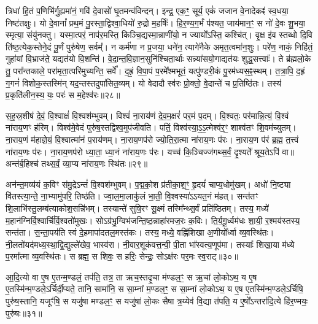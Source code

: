 त्रिधा॑ हि॒तं प॒णिभि॑र्गु॒ह्यमा॑नं॒ गवि॑ दे॒वासो॑ घृ॒तमन्व॑विन्दन्। 
इन्द्र॒ एक॒ꣳ॒ सूर्य॒ एकं॑ जजान वे॒नादेकꣴ॑ स्व॒धया॒ निष्ट॑तक्षुः। 
यो दे॒वानां᳚ प्रथ॒मं पु॒रस्ता॒द्विश्वा॒धियो॑ रु॒द्रो म॒हर्\mbox{}षिः॑। 
हि॒र॒ण्य॒ग॒र्भं प॑श्यत॒ जाय॑मान॒ꣳ॒ स नो॑ दे॒वः शु॒भया॒ स्मृत्या॒ संयु॑नक्तु। 
यस्मा॒त्परं॒ नाप॑र॒मस्ति॒ किञ्चि॒द्यस्मा॒न्नाणी॑यो॒ न ज्यायो᳚ऽस्ति॒ कश्चि॑त्। 
वृ॒क्ष इ॑व स्तब्धो दि॒वि ति॑ष्ठ॒त्येक॒स्तेने॒दं पू॒र्णं पुरु॑षेण॒ सर्वम्᳚। 
न कर्म॑णा न प्र॒जया॒ धने॑न॒ त्यागे॑नैके अमृत॒त्वमा॑न॒शुः। 
परे॑ण॒ नाकं॒ निहि॑तं॒ गुहा॑यां वि॒भ्राज॑ते॒ यद्यत॑यो वि॒शन्ति॑। 
वे॒दा॒न्त॒वि॒ज्ञान॒सुनि॑श्चिता॒र्थाः सन्न्या॑सयो॒गाद्यत॑यः शुद्ध॒सत्त्वाः᳚। 
ते ब्र॑ह्मलो॒के तु॒ परा᳚न्तकाले॒ परा॑मृता॒त्परि॑मुच्यन्ति॒ सर्वे᳚। 
द॒ह्रं॒ वि॒पा॒पं प॒रमे᳚श्मभूतं॒ यत्पु॑ण्डरी॒कं पु॒रम॑ध्यस॒ꣴ॒स्थम्। 
त॒त्रा॒पि॒ द॒ह्रं ग॒गनं॑ विशोक॒स्तस्मि॑न् यद॒न्तस्तदुपा॑सित॒व्यम्। 
यो वेदादौ स्व॑रः प्रो॒क्तो॒ वे॒दान्ते॑ च प्र॒तिष्ठि॑तः। 
तस्य॑ प्र॒कृति॑लीन॒स्य॒ यः॒ परः॑ स म॒हेश्व॑रः॥२८॥
\anuvakamend

स॒ह॒स्र॒शी\sr{}षं दे॒वं॒ वि॒श्वाक्षं॑ वि॒श्वश॑म्भुवम्। 
विश्वं॑ ना॒राय॑णं दे॒व॒म॒क्षरं॑ पर॒मं प॒दम्। 
वि॒श्वतः॒ पर॑मान्नि॒त्यं॒ वि॒श्वं ना॑राय॒णꣳ ह॑रिम्। 
विश्व॑मे॒वेदं पुरु॑ष॒स्तद्विश्व॒मुप॑जीवति। 
पतिं॒ विश्व॑स्या॒ऽ॒ऽ॒त्मेश्व॑र॒ꣳ॒ शाश्व॑तꣳ शि॒वम॑च्युतम्। 
ना॒राय॒णं म॑हाज्ञे॒यं॒ वि॒श्वात्मा॑नं प॒राय॑णम्। 
ना॒राय॒णप॑रो ज्यो॒ति॒रा॒त्मा ना॑राय॒णः प॑रः। 
ना॒राय॒ण प॑रं ब्र॒ह्म॒ त॒त्त्वं ना॑राय॒णः प॑रः। 
ना॒राय॒णप॑रो ध्या॒ता॒ ध्या॒नं ना॑राय॒णः प॑रः। 
यच्च॑ कि॒ञ्चिज्ज॑गथ्स॒र्वं॒ दृ॒श्यते᳚ श्रूय॒तेऽपि॑ वा॥ 
अन्त॑र्ब॒हिश्च॑ तथ्स॒र्वं॒ व्या॒प्य ना॑राय॒णः स्थि॑तः॥२९॥

अन॑न्त॒मव्य॑यं क॒विꣳ स॑मु॒द्रेऽन्तं॑ वि॒श्वश॑म्भुवम्। 
प॒द्म॒को॒श प्र॑तीका॒श॒ꣳ॒ हृ॒दयं॑ चाप्य॒धोमु॑खम्। 
अधो॑ नि॒ष्ट्या वि॑तस्त्या॒न्ते॒ ना॒भ्यामु॑परि॒ तिष्ठ॑ति। 
ज्वा॒ल॒मा॒लाकु॑लं भा॒ती॒ वि॒श्वस्या॑ऽऽयत॒नं म॑हत्। 
सन्त॑तꣳ शि॒लाभि॑स्तु॒\-लम्ब॑त्याकोश॒सन्नि॑भम्। 
तस्यान्ते॑ सुषि॒रꣳ सू॒क्ष्मं तस्मि᳚न्थ्स॒र्वं प्रति॑ष्ठितम्। 
तस्य॒ मध्ये॑ म॒हान॑\-ग्निर्वि॒श्वार्चि॑र्वि॒श्वतो॑मुखः। 
सोऽग्र॑भु॒ग्विभ॑जन्ति॒ष्ठ॒न्नाहा॑रमज॒रः क॒विः। 
ति॒र्य॒गू॒र्ध्वम॑धः शा॒यी॒ र॒श्मय॑स्तस्य॒ सन्त॑ता। 
स॒न्ता॒पय॑ति स्वं दे॒हमापा॑द\-तल॒\-मस्त॑कः। 
तस्य॒ मध्ये॒ वह्नि॑शिखा अ॒णीयो᳚र्ध्वा व्य॒वस्थि॑तः। 
नी॒लतो॑यद॑\-मध्य॒स्था॒द्वि॒द्युल्ले॑खेव॒ भास्व॑रा। 
नी॒वार॒शूक॑वत्त॒न्वी॒ पी॒ता भा᳚स्वत्य॒णूप॑मा। 
तस्याः᳚ शिखा॒या म॑ध्ये प॒रमा᳚त्मा व्य॒वस्थि॑तः। 
स ब्रह्म॒ स शिवः॒ स हरिः॒ सेन्द्रः॒ सोऽक्ष॑रः पर॒मः स्व॒राट्॥३०॥
\anuvakamend[ना॒रा॒य॒णः स्थि॑तो व्य॒वस्थि॑तश्च॒त्वारि॑ च]

आ॒दि॒त्यो वा ए॒ष ए॒तन्म॒ण्डलं॒ तप॑ति॒ तत्र॒ ता ऋच॒स्तदृ॒चा म॑ण्डल॒ꣳ॒ स ऋ॒चां लो॒कोऽथ॒ य ए॒ष ए॒तस्मि॑न्म॒ण्डले॒ऽर्चिर्दी॒प्यते॒ तानि॒ सामा॑नि॒ स सा॒म्नां म॒ण्डल॒ꣳ॒ स सा॒म्नां लो॒कोऽथ॒ य ए॒ष ए॒तस्मि॑न्म॒ण्डले॒ऽर्चिषि॒ पुरु॑ष॒स्तानि॒ यजूꣳ॑षि॒ स यजु॑षा मण्डल॒ꣳ॒ स यजु॑षां लो॒कः सैषा त्र॒य्येव॑ वि॒द्या त॑पति॒ य ए॒षो᳚ऽन्तरा॑दि॒त्ये हि॑र॒ण्मयः॒ पुरु॑षः॥३१॥
\anuvakamend


